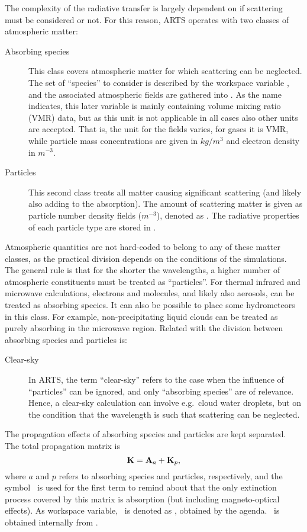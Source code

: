 The complexity of the radiative transfer is largely dependent on if scattering
must be considered or not. For this reason, ARTS operates with two classes of
atmospheric matter:
\begin{description}
\item[Absorbing species] This class covers atmospheric matter for which
  scattering can be neglected. The set of ``species'' to consider is described
  by the workspace variable , and the associated
  atmospheric fields are gathered into . As the name
  indicates, this later variable is mainly containing volume mixing ratio (VMR)
  data, but as this unit is not applicable in all cases also other units are
  accepted. That is, the unit for the fields varies, for gases it is VMR, while
  particle mass concentrations are given in $kg/m^3$ and electron density in
  $m^{-3}$. 
\item[Particles] This second class treats all matter causing significant
  scattering (and likely also adding to the absorption). The amount of
  scattering matter is given as particle number density fields ($m^{-3}$),
  denoted as . The radiative properties of each particle
  type are stored in .
\end{description}
Atmospheric quantities are not hard-coded to belong to any of these matter
classes, as the practical division depends on the conditions of the
simulations. The general rule is that for the shorter the wavelengths, a higher
number of atmospheric constituents must be treated as ``particles''. For
thermal infrared and microwave calculations, electrons and molecules, and
likely also aerosols, can be treated as absorbing species. It can also be
possible to place some hydrometeors in this class. For example,
non-precipitating liquid clouds can be treated as purely absorbing in the
microwave region.
Related with the division between absorbing species and particles is:
\begin{description}
\item[Clear-sky] In ARTS, the term ``clear-sky'' refers to the case when the
  influence of ``particles'' can be ignored, and only ``absorbing species'' are
  of relevance. Hence, a clear-sky calculation can involve e.g.\ cloud water
  droplets, but on the condition that the wavelength is such that scattering
  can be neglected.
\end{description}
The propagation effects of absorbing species and particles are kept separated.
The total propagation matrix is 
\begin{equation}
  \label{eq:propmattotal}
  {\bf K} = {\bf A}_{a} + {\bf K}_{p}, 
\end{equation}
where $a$ and $p$ refers to absorbing species and particles, respectively, and
the symbol \AbsMat\ is used for the first term to remind about that the only
extinction process covered by this matrix is absorption (but including
magneto-optical effects). As workspace variable, \ is denoted as
, obtained by the
 agenda. \ is obtained
internally from .



